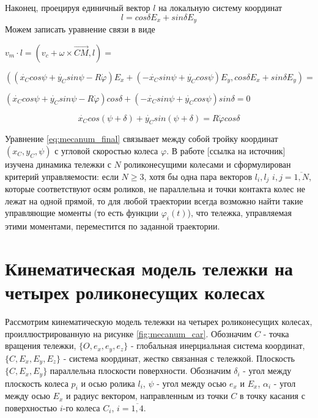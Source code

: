 \documentclass[oneside,final,14pt]{extreport}
\newcommand{\cmmnt}[1]{\ignorespaces}
\begin{document}
\begin{figure}[H]
\end{figure}

 Наконец, проецируя единичный вектор $l$ на локальную систему координат 
\begin{equation}
l
=
cos\delta
E_{x}
+
sin\delta
E_{y}
\end{equation}
Можем записать уравнение связи в виде
\begin{flushleft}
$
v_{m}
\cdot
l
=
(
v_{c}
+
\omega
\times
\overrightarrow{CM}
,
l
)
=
$

$
(
(
\dot{x_{C}}
cos\psi
+
\dot{y_{C}}
sin\psi
-R\dot{\varphi}
)
E_{x}
+
(
-\dot{x_{C}}
sin\psi
+
\dot{y_{C}}
cos\psi
)
E_{y}
,
cos\delta
E_{x}
+
sin\delta
E_{y}
)
=
$

$
(
\dot{x_{C}}
cos\psi
+
\dot{y_{C}}
sin\psi
-R\dot{\varphi}
)
cos\delta
+
(
-\dot{x_{C}}
sin\psi
+
\dot{y_{C}}
cos\psi
)
sin\delta
=
0
$
\end{flushleft}
\begin{equation}
\label{eq:mecanum_final}
\dot{x_{C}}
cos(\psi+\delta)
+
\dot{y_{C}}
sin(\psi+\delta)
=
R\dot{\varphi}
cos\delta
\end{equation}

Уравнение \ref{eq:mecanum_final} связывает между собой тройку координат $(x_{C},y_{C},\psi)$ с угловой скоростью колеса $\varphi$. В работе [ссылка на источник] изучена динамика тележки с $N$ роликонесущими колесами и сформулирован критерий управляемости:
если $N \geq 3$, хотя бы одна пара векторов  $l_{i}, l_{j}$ $i,j=\overline{1,N}$, которые соответствуют осям роликов, не параллельна и точки контакта колес не лежат на одной прямой, то для любой траектории всегда возможно найти такие управляющие моменты (то есть функции $\varphi_{i}(t)$), что тележка, управляемая этими моментами, переместится по заданной траектории.

\chapter{Кинематическая модель тележки на четырех роликонесущих колесах}
Рассмотрим кинематическую модель тележки на четырех роликонесущих колесах, проиллюстрированную на рисунке  \ref{fig:mecanum_car}. Обозначим $C$ - точка вращения тележки, $\{O,e_{x},e_{y},e_{z}\}$ - глобальная инерциальная система координат, $\{C,E_{x},E_{y},E_{z}\}$ - система координат, жестко связанная с тележкой. Плоскость $\{C,E_{x},E_{y}\}$ параллельна плоскости поверхности. Обозначим $\delta_{i}$ - угол между плоскость колеса $p_{i}$ и осью ролика $l_{i}$\cmmnt{, $\delta_{i} = \widehat{p_{i} l_{i}}$ }, $\psi$ - угол между осью $e_{x}$ и $E_{x}$\cmmnt{, $\psi$ = $\widehat{e_{x}E{x}}$}, $\alpha_{i}$ - угол между осью $E_{x}$ и радиус вектором, направленным из точки $C$ в точку касания с поверхностью $i$-го колеса $C_{i}$\cmmnt{,$\alpha_{i} = \widehat{E_{x}\overrightarrow{C C_{i}}}$}, $i=\overline{1,4}$. 
\end{document}
